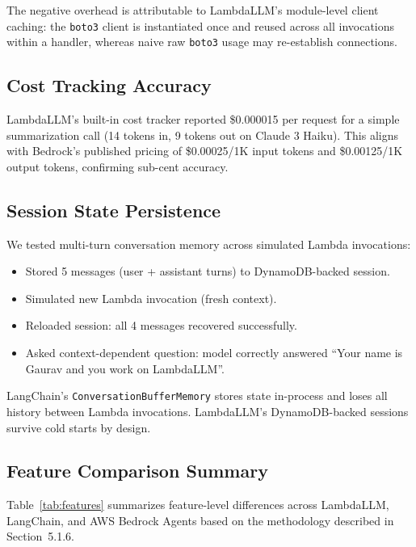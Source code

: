 \documentclass[10pt,twocolumn,letterpaper]{article}
\begin{document}
The negative overhead is attributable to LambdaLLM's module-level client caching: the \texttt{boto3} client is instantiated once and reused across all invocations within a handler, whereas naive raw \texttt{boto3} usage may re-establish connections.

\subsection{Cost Tracking Accuracy}

LambdaLLM's built-in cost tracker reported \$0.000015 per request for a simple summarization call (14 tokens in, 9 tokens out on Claude 3 Haiku). This aligns with Bedrock's published pricing of \$0.00025/1K input tokens and \$0.00125/1K output tokens, confirming sub-cent accuracy.

\subsection{Session State Persistence}

We tested multi-turn conversation memory across simulated Lambda invocations:

\begin{itemize}[leftmargin=*,itemsep=1pt,topsep=2pt]
    \item Stored 5 messages (user + assistant turns) to DynamoDB-backed session.
    \item Simulated new Lambda invocation (fresh context).
    \item Reloaded session: all 4 messages recovered successfully.
    \item Asked context-dependent question: model correctly answered ``Your name is Gaurav and you work on LambdaLLM''.
\end{itemize}

LangChain's \texttt{ConversationBufferMemory} stores state in-process and loses all history between Lambda invocations. LambdaLLM's DynamoDB-backed sessions survive cold starts by design.

\subsection{Feature Comparison Summary}

Table~\ref{tab:features} summarizes feature-level differences across LambdaLLM, LangChain, and AWS Bedrock Agents based on the methodology described in Section~5.1.6.
\end{document}
